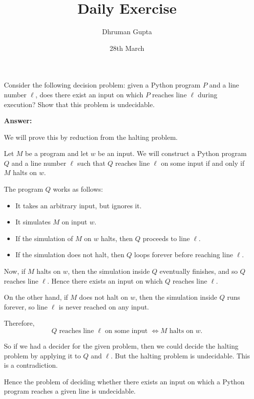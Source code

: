 \documentclass[11pt]{article}
\title{Daily Exercise}
\author{Dhruman Gupta}
\date{28th March}
\begin{document}

Consider the following decision problem: given a Python program $P$ and a line number $\ell$, does there exist an input on which $P$ reaches line $\ell$ during execution? Show that this problem is undecidable.

\textbf{Answer:}

We will prove this by reduction from the halting problem.

Let $M$ be a program and let $w$ be an input. We will construct a Python program $Q$ and a line number $\ell$ such that $Q$ reaches line $\ell$ on some input if and only if $M$ halts on $w$.

The program $Q$ works as follows:

\begin{itemize}
    \item It takes an arbitrary input, but ignores it.
    \item It simulates $M$ on input $w$.
    \item If the simulation of $M$ on $w$ halts, then $Q$ proceeds to line $\ell$.
    \item If the simulation does not halt, then $Q$ loops forever before reaching line $\ell$.
\end{itemize}

Now, if $M$ halts on $w$, then the simulation inside $Q$ eventually finishes, and so $Q$ reaches line $\ell$. Hence there exists an input on which $Q$ reaches line $\ell$.

On the other hand, if $M$ does not halt on $w$, then the simulation inside $Q$ runs forever, so line $\ell$ is never reached on any input.

Therefore,
\[
Q \text{ reaches line } \ell \text{ on some input } \iff M \text{ halts on } w.
\]

So if we had a decider for the given problem, then we could decide the halting problem by applying it to $Q$ and $\ell$. But the halting problem is undecidable. This is a contradiction.

Hence the problem of deciding whether there exists an input on which a Python program reaches a given line is undecidable.
\end{document}
